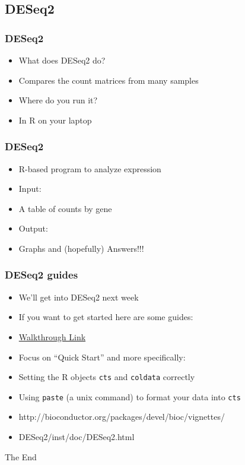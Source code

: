 \documentclass[14pt,handout]{beamer}
\begin{document}
\subsection{DESeq2}

\begin{frame}
\frametitle{DESeq2}
\begin{itemize}
	\item<+-> What does DESeq2 do?
	\item<+-> Compares the count matrices from many samples
	\item<+-> Where do you run it?
	\item<+-> In R on your laptop
\end{itemize}
\end{frame}

\begin{frame}
\frametitle{DESeq2}
\begin{itemize}
	\item<+-> R-based program to analyze expression
	\item<+-> Input: 
	\item<+-> A table of counts by gene
	\item<+-> Output: 
	\item<+-> Graphs and (hopefully) Answers!!!
\end{itemize}
\end{frame}


\begin{frame}
\frametitle{DESeq2 guides}
\begin{itemize}
	\item We'll get into DESeq2 next week
	\item If you want to get started here are some guides:
	\item \href{http://bioconductor.org/packages/devel/bioc/vignettes/DESeq2/inst/doc/DESeq2.html}{Walkthrough Link}
	\item Focus on ``Quick Start'' and more specifically:
	\item Setting the R objects \texttt{cts} and \texttt{coldata} correctly
	\item Using \texttt{paste} (a unix command) to format your data into \texttt{cts}
	\footnotesize
	\item[] http://bioconductor.org/packages/devel/bioc/vignettes/
	\item[] DESeq2/inst/doc/DESeq2.html
\end{itemize}
\end{frame}


\begin{frame}
\Huge{\centerline{The End}}
\end{frame}

\end{document}
